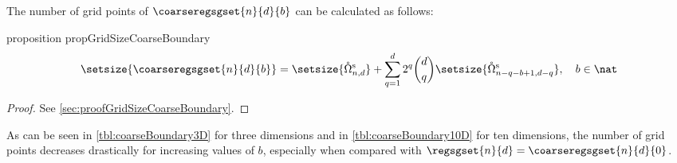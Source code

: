 The number of grid points of $\coarseregsgset{n}{d}{b}$
can be calculated as follows:
\begin{restatable}{%
  proposition%
}{%
  propGridSizeCoarseBoundary%
}
  \label{prop:gridSizeCoarseBoundary}
  \setlength{\abovedisplayskip}{0pt}
  \begin{equation}
    \setsize{\coarseregsgset{n}{d}{b}}
    = \setsize{\interiorregsgset{n}{d}} +
    \sum_{q=1}^d 2^q \binom{d}{q}
    \setsize{\interiorregsgset{n-q-b+1}{d-q}},\quad
    b \in \nat
  \end{equation}
\end{restatable}
\begin{proof}
  See \cref{sec:proofGridSizeCoarseBoundary}.
\end{proof}
As can be seen in \cref{tbl:coarseBoundary3D} for three dimensions and
in \cref{tbl:coarseBoundary10D} for ten dimensions,
the number of grid points decreases drastically for increasing values
of $b$, especially when compared with
$\regsgset{n}{d} = \coarseregsgset{n}{d}{0}$.

